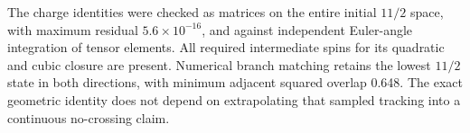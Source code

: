 The charge identities were checked as matrices on the entire initial
$11/2$ space, with maximum residual $5.6\times10^{-16}$, and against
independent Euler-angle integration of tensor elements.
All required intermediate spins for its quadratic and cubic closure
are present. Numerical branch matching retains the lowest $11/2$
state in both directions, with minimum adjacent squared overlap 0.648.
The exact geometric identity does not depend on extrapolating that
sampled tracking into a continuous no-crossing claim.
